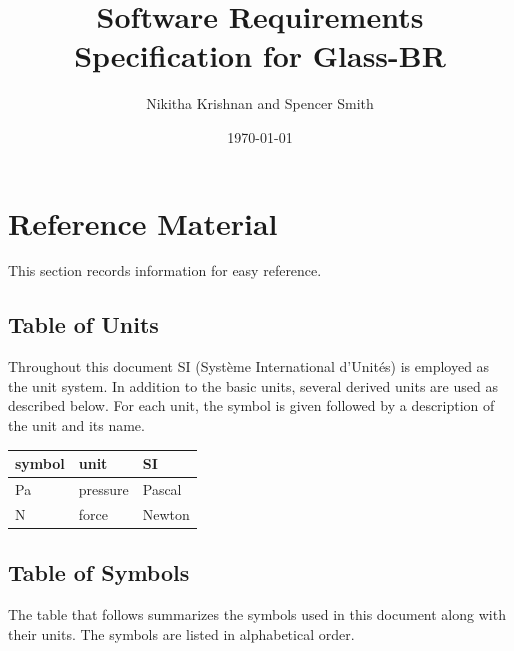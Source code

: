 \documentclass[12pt]{article}
\newcommand{\authornote}[3]{\textcolor{#1}{[#3 ---#2]}}
\newcommand{\authornote}[3]{}
\newcommand{\wss}[1]{\authornote{magenta}{SS}{#1}}
\newcommand{\progname}{Glass-BR}
\begin{document}
\title{Software Requirements Specification for \progname} 
\author{Nikitha Krishnan and Spencer Smith}
\date{\today}

\maketitle

\tableofcontents

\section{Reference Material}

This section records information for easy reference.

\subsection{Table of Units}

Throughout this document SI (Syst\`{e}me International d'Unit\'{e}s) is employed
as the unit system. In addition to the basic units, several derived units are
used as described below.  For each unit, the symbol is given followed by 
a description of the unit and its name. 
~\newline

\renewcommand{\arraystretch}{1.2}
  \noindent \begin{tabular}{l l l} 
    \toprule		
    \textbf{symbol} & \textbf{unit} & \textbf{SI}\\
    \midrule 
    \si{\pascal} & pressure & Pascal\\
    \si{\newton} & force & Newton\\	
    \bottomrule
  \end{tabular}

\subsection{Table of Symbols}\label{TblSym}

The table that follows summarizes the symbols used in this document along with 
their units.  The symbols are listed in alphabetical order.
\newline

\renewcommand{\arraystretch}{1.2}
\end{document}
